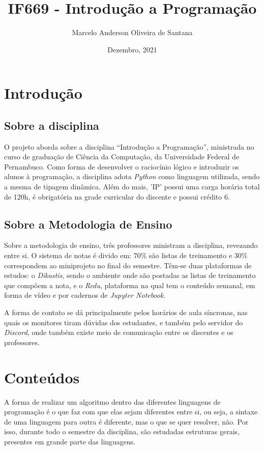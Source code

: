 \documentclass[a4paper, 12pt]{article} %
\title{IF669 - Introdução a Programação}
\author{Marcelo Anderson Oliveira de Santana}
\date{Dezembro, 2021}
\begin{document}
\maketitle

\section{Introdução}
\subsection{Sobre a disciplina}
O projeto aborda sobre a disciplina “Introdução a Programação”, ministrada no curso de graduação de Ciência da Computação, da Universidade Federal de Pernambuco. Como forma de desenvolver o raciocínio lógico e introduzir os alunos à programação, a disciplina adota \textit{Python} como linguagem utilizada, sendo a mesma de tipagem dinâmica. Além do mais, 'IP' possui uma carga horária total de 120h, é obrigatória na grade curricular do discente e possui crédito 6. 

\subsection{Sobre a Metodologia de Ensino}
Sobre a metodologia de ensino, três professores ministram a disciplina, revezando entre si. O sistema de notas é divido em: $70\%$ são listas de treinamento e $30\%$ correspondem ao miniprojeto no final do semestre. 
Têm-se duas plataformas de estudos: o \textit{Dikastis}, sendo o ambiente onde são postadas as listas de treinamento que compõem a nota, e o \textit{Redu}, plataforma na qual tem o conteúdo semanal, em forma de vídeo e por cadernos de \textit{Jupyter Notebook}.

A forma de contato se dá principalmente pelos horários de aula síncronas, nas quais os monitores tiram dúvidas dos estudantes, e também pelo servidor do \textit{Discord}, onde também existe meio de comunicação entre os discentes e os professores.

\section{Conteúdos}
A forma de realizar um algoritmo dentro das diferentes linguagens de programação é o que faz com que elas sejam diferentes entre si, ou seja, a sintaxe de uma linguagem para outra é diferente, mas o que se quer resolver, não. Por isso, durante todo o semestre da disciplina, são estudadas estruturas gerais, presentes em grande parte das linguagens. 
\end{document}
